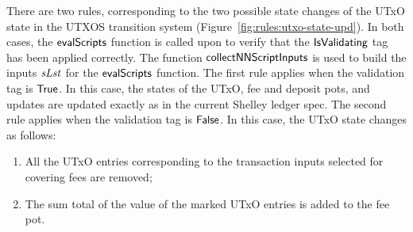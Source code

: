There are two rules, corresponding to the two possible state changes of the
UTxO state in the UTXOS transition system (Figure~\ref{fig:rules:utxo-state-upd}).
%
In both cases, the $\mathsf{evalScripts}$ function is called upon to verify that the $\mathsf{IsValidating}$
tag has been applied correctly. The function $\mathsf{collectNNScriptInputs}$ is used to build
the inputs $\mathit{sLst}$ for the $\mathsf{evalScripts}$ function.
%
The first rule
applies when the validation tag is $\mathsf{True}$.
In this case, the states of the UTxO, fee
  and deposit pots, and updates are updated exactly as in the current Shelley
  ledger spec.
%
  The second rule
  applies when the validation tag is $\mathsf{False}$.
  In this case, the UTxO state changes as follows:

  \begin{enumerate}
    \item All the
    UTxO entries corresponding to the transaction inputs selected for covering
    fees are removed;

    \item The sum total of the value of the marked UTxO entries
    is added to the fee pot.
  \end{enumerate}


